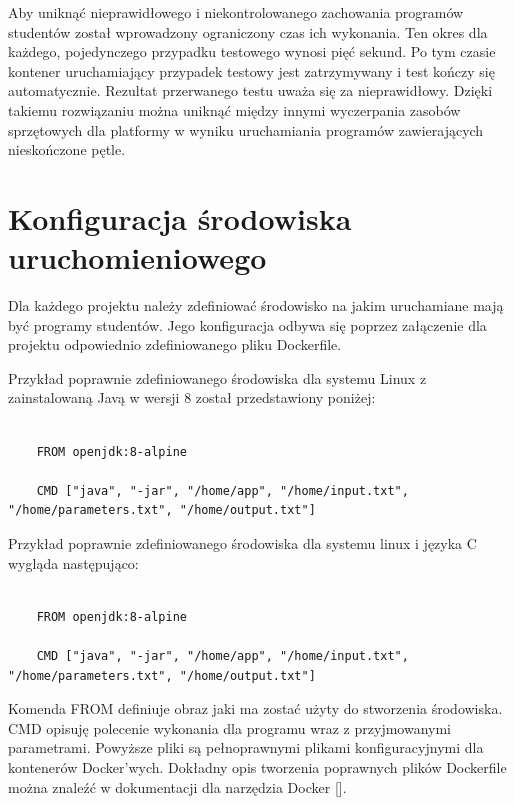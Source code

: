 Aby uniknąć nieprawidłowego i niekontrolowanego zachowania programów studentów został wprowadzony ograniczony czas ich wykonania.
Ten okres dla każdego, pojedynczego przypadku testowego wynosi pięć sekund.
Po tym czasie kontener uruchamiający przypadek testowy jest zatrzymywany i test kończy się automatycznie.
Rezultat przerwanego testu uważa się za nieprawidłowy.
Dzięki takiemu rozwiązaniu można uniknąć między innymi wyczerpania zasobów sprzętowych dla platformy w wyniku uruchamiania programów zawierających nieskończone pętle.

\vfill

\section {Konfiguracja środowiska uruchomieniowego}
\label{environment_configuration}

Dla każdego projektu należy zdefiniować środowisko na jakim uruchamiane mają być programy studentów.
Jego konfiguracja odbywa się poprzez załączenie dla projektu odpowiednio zdefiniowanego pliku Dockerfile.

Przykład poprawnie zdefiniowanego środowiska dla systemu Linux z zainstalowaną Javą w wersji 8 został przedstawiony poniżej:

{\selectfont
\tiny
\begin{lstlisting}

    FROM openjdk:8-alpine

    CMD ["java", "-jar", "/home/app", "/home/input.txt", "/home/parameters.txt", "/home/output.txt"]

\end{lstlisting}
}

Przykład poprawnie zdefiniowanego środowiska dla systemu linux i języka C wygląda następująco:

{\selectfont
\tiny
\begin{lstlisting}

    FROM openjdk:8-alpine

    CMD ["java", "-jar", "/home/app", "/home/input.txt", "/home/parameters.txt", "/home/output.txt"]

\end{lstlisting}
}

Komenda FROM definiuje obraz jaki ma zostać użyty do stworzenia środowiska.
CMD opisuję polecenie wykonania dla programu wraz z przyjmowanymi parametrami.
Powyższe pliki są pełnoprawnymi plikami konfiguracyjnymi dla kontenerów Docker'wych.
Dokładny opis tworzenia poprawnych plików Dockerfile można znaleźć w dokumentacji dla narzędzia Docker [].

